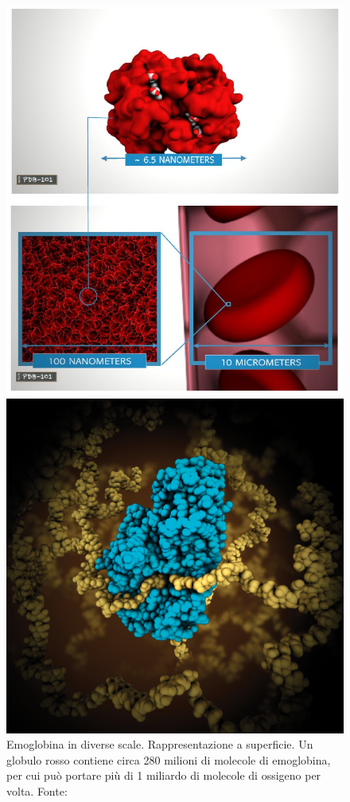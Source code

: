 \begin{figure}[!htb]
	\centering
	\includegraphics[scale=0.38]{images/emoglobina-dimensioni.png}
	\caption{Emoglobina in diverse scale. Rappresentazione a superficie. Un globulo rosso contiene circa 280 milioni di molecole di emoglobina, per cui può portare più di 1 miliardo di molecole di ossigeno per volta. Fonte: \cite{ProteinRCSB}}
	\label{fig:emoglobina-dimensioni}
	\endminipage\hfill
	\centering
	\includegraphics[scale=0.11]{images/Alpha-amylase.png}

\end{figure}
